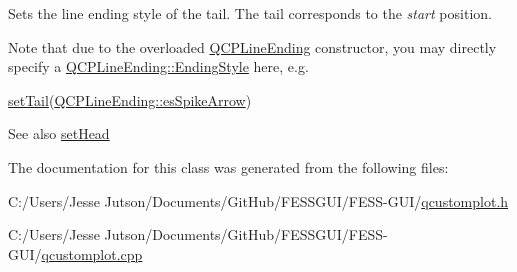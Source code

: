 Sets the line ending style of the tail. The tail corresponds to the {\itshape start} position.

Note that due to the overloaded \hyperlink{class_q_c_p_line_ending}{Q\+C\+P\+Line\+Ending} constructor, you may directly specify a \hyperlink{class_q_c_p_line_ending_a5ef16e6876b4b74959c7261d8d4c2cd5}{Q\+C\+P\+Line\+Ending\+::\+Ending\+Style} here, e.\+g.
\begin{DoxyCode}
\hyperlink{class_q_c_p_item_line_ac264222c3297a7efe33df9345c811a5f}{setTail}(\hyperlink{class_q_c_p_line_ending_a5ef16e6876b4b74959c7261d8d4c2cd5ab9964d0d03f812d1e79de15edbeb2cbf}{QCPLineEnding::esSpikeArrow}) 
\end{DoxyCode}


\begin{DoxySeeAlso}{See also}
\hyperlink{class_q_c_p_item_line_aebf3d687114d584e0459db6759e2c3c3}{set\+Head} 
\end{DoxySeeAlso}


The documentation for this class was generated from the following files\+:\begin{DoxyCompactItemize}
\item 
C\+:/\+Users/\+Jesse Jutson/\+Documents/\+Git\+Hub/\+F\+E\+S\+S\+G\+U\+I/\+F\+E\+S\+S-\/\+G\+U\+I/\hyperlink{qcustomplot_8h}{qcustomplot.\+h}\item 
C\+:/\+Users/\+Jesse Jutson/\+Documents/\+Git\+Hub/\+F\+E\+S\+S\+G\+U\+I/\+F\+E\+S\+S-\/\+G\+U\+I/\hyperlink{qcustomplot_8cpp}{qcustomplot.\+cpp}\end{DoxyCompactItemize}
